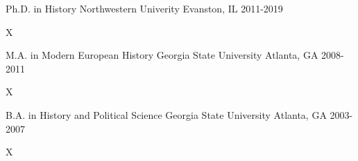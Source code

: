 

\begin{cventries}



  \cventry
    {Ph.D. in History} %
    {Northwestern Univerity} %
    {Evanston, IL} %
    {2011-2019} %
    {
      \begin{cvitems} %
        \item {X}
      \end{cvitems}
    }


  \cventry
    {M.A. in Modern European History} %
    {Georgia State University} %
    {Atlanta, GA} %
    {2008-2011} %
    {
      \begin{cvitems} %
        \item {X}
      \end{cvitems}
    }


  \cventry
    {B.A. in History and Political Science} %
    {Georgia State University} %
    {Atlanta, GA} %
    {2003-2007} %
    {
      \begin{cvitems} %
        \item {X}
      \end{cvitems}
    }

\end{cventries}

